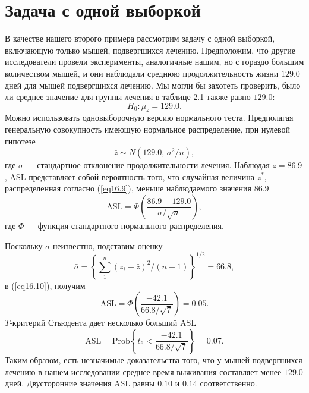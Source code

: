 \section{Задача с одной выборкой}

В качестве нашего второго примера рассмотрим задачу с одной выборкой, включающую только мышей, подвергшихся лечению. Предположим, что другие исследователи провели эксперименты, аналогичные нашим, но с гораздо большим количеством мышей, и они наблюдали среднюю продолжительность жизни $129.0$ дней для мышей подвергшихся лечению. Мы могли бы захотеть проверить, было ли среднее значение для группы лечения в таблице 2.1 также  равно $129.0$:
\begin{equation}\label{eq16.8}
    H_0: \mu_z = 129.0.
\end{equation}
Можно использовать одновыборочную версию нормального теста. Предполагая генеральную совокупность имеющую нормальное распределение, при нулевой гипотезе
\begin{equation}\label{eq16.9}
    \bar{z} \sim N(129.0,\,\sigma^{2}/n),
\end{equation}
где $\sigma$ --- стандартное отклонение продолжительности лечения. Наблюдая $\bar{z} = 86.9$, $\text{ASL}$ представляет собой вероятность того, что случайная величина $\bar{z}^{*}$, распределенная согласно (\ref{eq16.9}), меньше наблюдаемого значения $86.9$
\begin{equation}\label{eq16.10}
    \text{ASL} = \Phi\left(\frac{86.9-129.0}{\sigma/\sqrt{n}}\right),
\end{equation}
где $\Phi$ --- функция стандартного нормального распределения.

Поскольку $\sigma$ неизвестно, подставим оценку
\begin{equation}\label{eq16.11}
    \bar{\sigma} = \left\{\sum\limits_{1}^{n}(z_i-\bar{z})^2/(n-1)\right\}^{1/2} = 66.8,
\end{equation}
в (\ref{eq16.10}), получим
\begin{equation}\label{eq16.12}
    \text{ASL} = \Phi\left(\frac{-42.1}{66.8/\sqrt{7}}\right) = 0.05.
\end{equation}
$T$-критерий Стьюдента дает несколько больший $\text{ASL}$
\begin{equation}\label{eq16.13}
    \text{ASL} = \text{Prob}\left\{t_6 < \frac{-42.1}{66.8/\sqrt{7}}\right\} = 0.07.
\end{equation}
Таким образом, есть незначимые доказательства того, что у мышей подвергшихся лечению в нашем исследовании среднее время выживания составляет менее $129.0$ дней. Двусторонние значения $\text{ASL}$ равны $0.10$ и $0.14$ соответственно.

